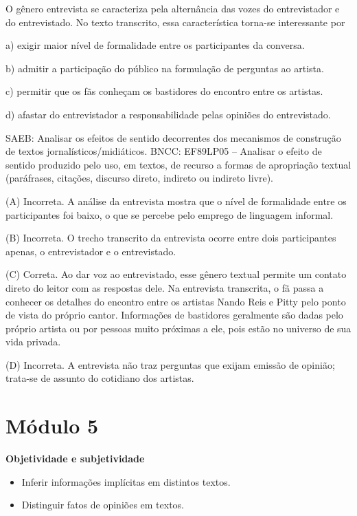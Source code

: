 O gênero entrevista se caracteriza pela alternância das vozes do
entrevistador e do entrevistado. No texto transcrito, essa
característica torna-se interessante por

a) exigir maior nível de formalidade entre os participantes da conversa.

b) admitir a participação do público na formulação de perguntas ao
artista.

c) permitir que os fãs conheçam os bastidores do encontro entre os
artistas.

d) afastar do entrevistador a responsabilidade pelas opiniões do
entrevistado.

SAEB: Analisar os efeitos de sentido decorrentes dos mecanismos de
construção de textos jornalísticos/midiáticos. BNCC: EF89LP05 --
Analisar o efeito de sentido produzido pelo uso, em textos, de recurso a
formas de apropriação textual (paráfrases, citações, discurso direto,
indireto ou indireto livre).

(A) Incorreta. A análise da entrevista mostra que o nível de formalidade
entre os participantes foi baixo, o que se percebe pelo emprego de
linguagem informal.

(B) Incorreta. O trecho transcrito da entrevista ocorre entre dois
participantes apenas, o entrevistador e o entrevistado.

(C) Correta. Ao dar voz ao entrevistado, esse gênero textual permite um
contato direto do leitor com as respostas dele. Na entrevista
transcrita, o fã passa a conhecer os detalhes do encontro entre os
artistas Nando Reis e Pitty pelo ponto de vista do próprio cantor.
Informações de bastidores geralmente são dadas pelo próprio artista ou
por pessoas muito próximas a ele, pois estão no universo de sua vida
privada.

(D) Incorreta. A entrevista não traz perguntas que exijam emissão de
opinião; trata-se de assunto do cotidiano dos artistas.


\section{Módulo 5}

\textbf{Objetividade e subjetividade}


\begin{itemize}
\tightlist
\item
  Inferir informações implícitas em distintos textos.
\item
  Distinguir fatos de opiniões em textos.
\end{itemize}


